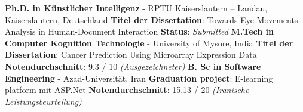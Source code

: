 %
%
%

\vspace{1em}

\begin{scholarship}
	{
		\textbf{Ph.D. in Künstlicher Intelligenz} - RPTU Kaiserslautern -- Landau, Kaiserslautern, Deutschland \newline
		\textbf{Titel der Dissertation}: Towards Eye Movements Analysis in Human-Document Interaction \newline
		\textbf{Status}: \textit{Submitted} \newline
	}
	{
		\textbf{M.Tech in Computer Kognition Technologie} - University of Mysore, India \newline
		\textbf{Titel der Dissertation}: Cancer Prediction Using Microarray Expression Data \newline
		\textbf{Notendurchschnitt}: 9.3 / 10 \textit{(Ausgezeichneter) }\newline
	}
	{
		\textbf{B. Sc in Software Engineering} - Azad-Universität, Iran \newline
		\textbf{Graduation project}: E-learning platform mit ASP.Net \newline
		\textbf{Notendurchschnitt}: 15.13 / 20 \textit{(Iranische Leistungsbeurteilung)}  \newline
	}
\end{scholarship}